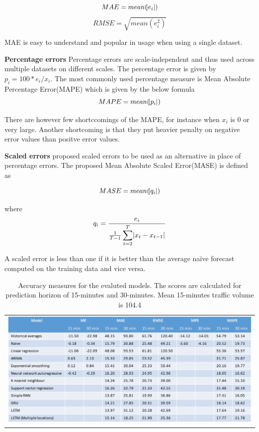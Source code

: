     \begin{equation}
        MAE = mean(\abs{e_{i}})
    \end{equation}
    \begin{equation}
        RMSE = \sqrt{mean(e^{2}_{i})}
    \end{equation}

MAE is easy to understand and popular in usage when using a single dataset.

\textbf{Percentage errors}
Percentage errors are scale-independent and thus used across multiple datasets on different
scales. The percentage error is given by $p_{i} = 100*e_{i}/x_{i}$. The most commonly used
percentage measure is Mean Absolute Percentage Error(MAPE) which is given by the below formula
    \begin{equation}
        MAPE = mean(\abs{p_{i}})
    \end{equation}

There are however few shortccomings of the MAPE, for instance when $x_{i}$ is 0 or very large.
Another shortcoming is that they put heavier penalty on negative error values than positve error
values.

\textbf{Scaled errors}
\citet{hyndman2006another} proposed scaled errors to be used as an alternative in place of
percentage errors. The proposed Mean Absolute Scaled Error(MASE) is defined as

    \begin{equation}
        MASE = mean(\abs{q_{i}})
    \end{equation}

where
    \begin{equation}
        q_{i} = \frac{e_{i}}{\frac{1}{T-1} \displaystyle\sum_{t=2}^{T}\abs{x_{t} - x_{t-1}}}
    \end{equation}

A scaled error is less than one if it is better than the average naïve forecast computed on the
training data and vice versa.

\begin{table}
    \begin{tabular}{c}
        \includegraphics[width=\textwidth,height=\textheight,keepaspectratio]{Figures/errors-table.pdf}
    \end{tabular}
    \caption[Model comparisons]{Accuracy measures for the evaluted models. The scores are
    calculated for prediction horizon of 15-minutes and 30-minutes. Mean 15-minutes traffic
    volume is 104.4}
    \label{table:accuracyScores}
\end{table}
